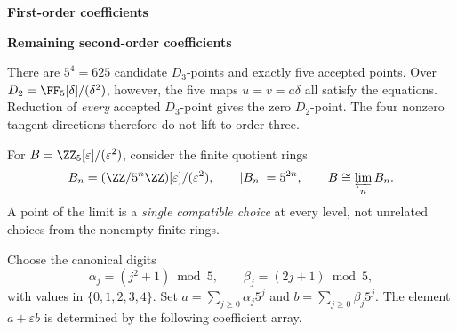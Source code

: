 \begin{minipage}[t]{.48\linewidth}\centering
{\sffamily\small\bfseries First-order coefficients}\par
{}
\end{minipage}\hfill
\begin{minipage}[t]{.48\linewidth}\centering
{\sffamily\small\bfseries Remaining second-order coefficients}\par
{}
\end{minipage}

There are $5^4=625$ candidate $D_3$-points and exactly five accepted points. Over $D_2=\FF_5[\delta]/(\delta^2)$, however, the five maps $u=v=a\delta$ all satisfy the equations. Reduction of \emph{every} accepted $D_3$-point gives the zero $D_2$-point. The four nonzero tangent directions therefore do not lift to order three.


For $B=\ZZ_5[\varepsilon]/(\varepsilon^2)$, consider the finite quotient rings
\[
B_n=(\ZZ/5^n\ZZ)[\varepsilon]/(\varepsilon^2),
\qquad |B_n|=5^{2n},\qquad B\cong\varprojlim_n B_n.
\]
A point of the limit is a \emph{single compatible choice} at every level, not unrelated choices from the nonempty finite rings.

Choose the canonical digits
\[
\alpha_j=(j^2+1)\bmod5,\qquad \beta_j=(2j+1)\bmod5,
\]
with values in $\{0,1,2,3,4\}$. Set $a=\sum_{j\ge0}\alpha_j5^j$ and $b=\sum_{j\ge0}\beta_j5^j$. The element $a+\varepsilon b$ is determined by the following coefficient array.


